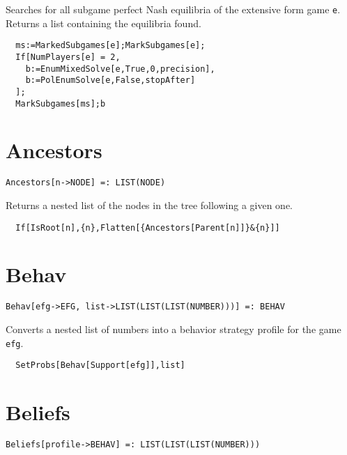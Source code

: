 \noindent Searches for all subgame perfect Nash equilibria of the extensive
form game \verb+e+.  Returns a list containing the equilibria found.

\udfbody
\begin{verbatim}
  ms:=MarkedSubgames[e];MarkSubgames[e];
  If[NumPlayers[e] = 2, 
    b:=EnumMixedSolve[e,True,0,precision],
    b:=PolEnumSolve[e,False,stopAfter]
  ];
  MarkSubgames[ms];b
\end{verbatim} 


\section*{Ancestors}\label{ExtAncestors}
\begin{verbatim}
Ancestors[n->NODE] =: LIST(NODE) 
\end{verbatim}

\noindent
Returns a nested list of the nodes in the tree following a given one.  

\udfbody
\begin{verbatim}
  If[IsRoot[n],{n},Flatten[{Ancestors[Parent[n]]}&{n}]]
\end{verbatim} 


\section*{Behav}\label{ExtBehav}
\begin{verbatim}
Behav[efg->EFG, list->LIST(LIST(LIST(NUMBER)))] =: BEHAV 
\end{verbatim}

\noindent
Converts a nested list of numbers into a behavior strategy
profile for the game \verb+efg+.

\udfbody
\begin{verbatim}
  SetProbs[Behav[Support[efg]],list]
\end{verbatim} 


\section*{Beliefs}\label{ExtBeliefs}
\begin{verbatim}
Beliefs[profile->BEHAV] =: LIST(LIST(LIST(NUMBER)))
\end{verbatim}

